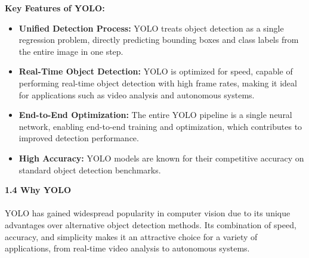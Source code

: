 %
\textbf{Key Features of YOLO: }
  \begin{itemize}
  \item \textbf{Unified Detection Process:} YOLO treats object detection as a single regression problem, directly predicting bounding boxes and class labels from the entire image in one step.
  \item \textbf{Real-Time Object Detection:} YOLO is optimized for speed, capable of performing real-time object detection with high frame rates, making it ideal for applications such as video analysis and autonomous systems.
  \item \textbf{End-to-End Optimization:} The entire YOLO pipeline is a single neural network, enabling end-to-end training and optimization, which contributes to improved detection performance.
  \item \textbf{High Accuracy:} YOLO models are known for their competitive accuracy on standard object detection benchmarks.
  \\
  \end{itemize}
%
{ \textbf{1.4 {Why YOLO}}}\\\\
%
YOLO has gained widespread popularity in computer vision due to its unique advantages over alternative object detection methods. Its combination of speed, accuracy, and simplicity makes it an attractive choice for a variety of applications, from real-time video analysis to autonomous systems.\\\\\\\\
